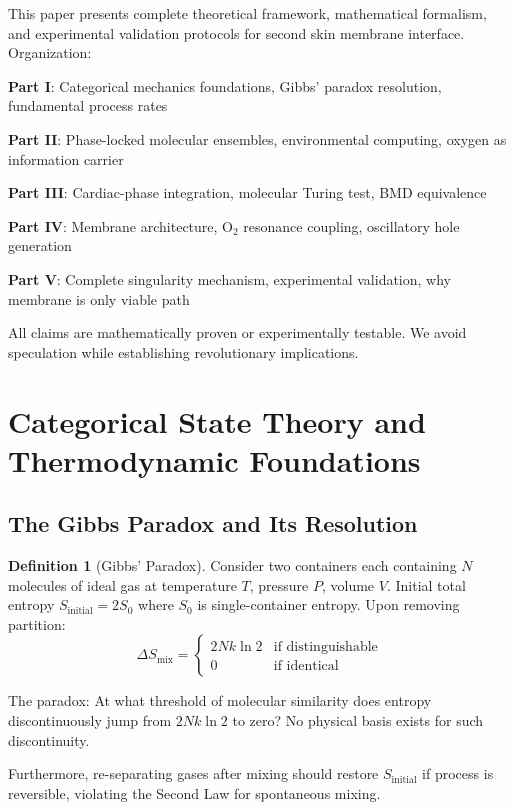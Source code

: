 \documentclass[11pt,a4paper]{article}
\theoremstyle{definition}
\newtheorem{definition}[theorem]{Definition}
\theoremstyle{remark}
\begin{document}
This paper presents complete theoretical framework, mathematical formalism, and experimental validation protocols for second skin membrane interface. Organization:

\textbf{Part I}: Categorical mechanics foundations, Gibbs' paradox resolution, fundamental process rates

\textbf{Part II}: Phase-locked molecular ensembles, environmental computing, oxygen as information carrier

\textbf{Part III}: Cardiac-phase integration, molecular Turing test, BMD equivalence

\textbf{Part IV}: Membrane architecture, O$_2$ resonance coupling, oscillatory hole generation

\textbf{Part V}: Complete singularity mechanism, experimental validation, why membrane is only viable path

All claims are mathematically proven or experimentally testable. We avoid speculation while establishing revolutionary implications.

\section{Categorical State Theory and Thermodynamic Foundations}

\subsection{The Gibbs Paradox and Its Resolution}

\begin{definition}[Gibbs' Paradox]
Consider two containers each containing $N$ molecules of ideal gas at temperature $T$, pressure $P$, volume $V$. Initial total entropy $S_{\text{initial}} = 2S_0$ where $S_0$ is single-container entropy. Upon removing partition:
\begin{equation}
\Delta S_{\text{mix}} = \begin{cases}
2Nk \ln 2 & \text{if distinguishable} \\
0 & \text{if identical}
\end{cases}
\end{equation}

The paradox: At what threshold of molecular similarity does entropy discontinuously jump from $2Nk \ln 2$ to zero? No physical basis exists for such discontinuity.

Furthermore, re-separating gases after mixing should restore $S_{\text{initial}}$ if process is reversible, violating the Second Law for spontaneous mixing.
\end{definition}
\end{document}
